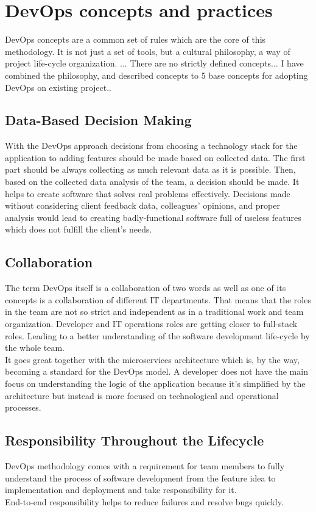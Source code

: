 \section{DevOps concepts and practices} DevOps concepts are a common set of rules which are the core of this methodology. It is not just a set of tools, but a cultural philosophy, a way of project life-cycle organization. ... There are no strictly defined concepts... I have combined the philosophy, and described concepts to 5 base concepts for adopting DevOps on existing project..

\subsection{Data-Based Decision Making} With the DevOps approach decisions from choosing a technology stack for the application to adding features should be made based on collected data. The first part should be always collecting as much relevant data as it is possible. Then, based on the collected data analysis of the team, a decision should be made. It helps to create software that solves real problems effectively. Decisions made without considering client feedback data, colleagues' opinions, and proper analysis would lead to creating badly-functional software full of useless features which does not fulfill the client's needs.

\subsection{Collaboration} The term DevOps itself is a collaboration of two words as well as one of its concepts is a collaboration of different IT departments. That means that the roles in the team are not so strict and independent as in a traditional work and team organization. Developer and IT operations roles are getting closer to full-stack roles. Leading to a better understanding of the software development life-cycle by the whole team.\\
It goes great together with the microservices architecture which is, by the way, becoming a standard for the DevOps model. A developer does not have the main focus on understanding the logic of the application because it's simplified by the architecture but instead is more focused on technological and operational processes. 

\subsection{Responsibility Throughout the Lifecycle} DevOps methodology comes with a requirement for team members to fully understand the process of software development from the feature idea to implementation and deployment and take responsibility for it.\\
End-to-end responsibility helps to reduce failures and resolve bugs quickly.

